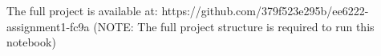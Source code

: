 \markdownRendererDocumentBegin
The full project is available at: \markdownRendererBackslash{} https://github.com/379f523e295b/ee6222-assignment1-fc9a \markdownRendererBackslash{} (NOTE: The full project structure is required to run this notebook)\markdownRendererDocumentEnd